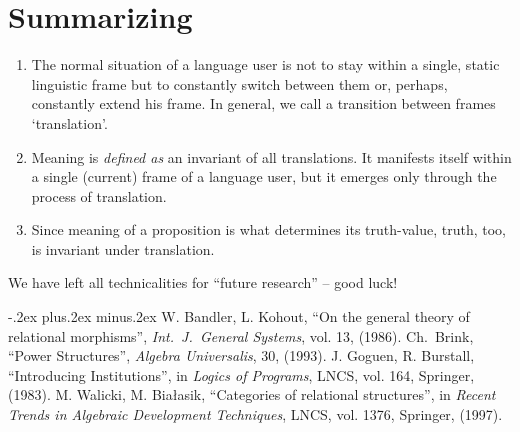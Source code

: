 \documentclass[10pt]{article}
\newcommand{\<}{\langle}
\renewcommand{\>}{\rangle}
\newcommand{\MyLPar}{\parsep -.2ex plus.2ex minus.2ex\itemsep\parsep
   \vspace{-\topsep}\vspace{.5ex}}
\newcommand{\wo}[1]{`#1'}
\begin{document}
\section{Summarizing}
\begin{enumerate}
\item The normal situation of a language user is not to stay within a single, 
static linguistic frame but to constantly switch between them or, perhaps, constantly
extend his frame. In general, we call a transition between frames \wo{translation}.
\item Meaning is {\em defined as} an invariant of all translations. It manifests 
itself within a single (current) frame of a language user, but it emerges only through
the process of translation.
\item Since meaning of a proposition is what determines its truth-value, truth, too, 
is invariant under translation.
\end{enumerate}
We have left all technicalities for ``future research'' -- good luck!
\begin{thebibliography}{MM99}\MyLPar
{} W. Bandler, L. Kohout, ``On the general theory of relational 
  morphisms'', {\em Int.~J.~General Systems}, vol. 13, (1986).
 Ch.~Brink, 
  ``Power Structures'', {\em Algebra Universalis}, 30, (1993).
 J. Goguen, R. Burstall, ``Introducing Institutions'', in
 {\em Logics of Programs}, LNCS, vol. 164, Springer, (1983).
 M. Walicki, M. Bia{\l}asik, ``Categories of relational structures'', 
 in {\em Recent Trends in Algebraic Development Techniques}, LNCS, vol. 1376, Springer, 
 (1997).


\end{thebibliography}
\end{document}
